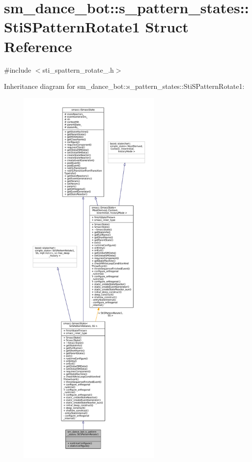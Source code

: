 \hypertarget{structsm__dance__bot_1_1s__pattern__states_1_1StiSPatternRotate1}{}\section{sm\+\_\+dance\+\_\+bot\+:\+:s\+\_\+pattern\+\_\+states\+:\+:Sti\+S\+Pattern\+Rotate1 Struct Reference}
\label{structsm__dance__bot_1_1s__pattern__states_1_1StiSPatternRotate1}


{\ttfamily \#include $<$sti\+\_\+spattern\+\_\+rotate\+\_.\+h$>$}



Inheritance diagram for sm\+\_\+dance\+\_\+bot\+:\+:s\+\_\+pattern\+\_\+states\+:\+:Sti\+S\+Pattern\+Rotate1\+:
\nopagebreak
\begin{figure}[H]
\begin{center}
\leavevmode
\includegraphics[height=550pt]{structsm__dance__bot_1_1s__pattern__states_1_1StiSPatternRotate1__inherit__graph}
\end{center}
\end{figure}


